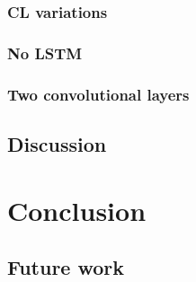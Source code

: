         \subsection{CL variations}
        
        \subsection{No LSTM}
        
        \subsection{Two convolutional layers}
        
    \section{Discussion}
    
% 
% 
\chapter{\label{chap:conclusion}Conclusion}

    \section{Future work}
    